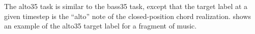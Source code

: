 
The \gls{alto35} task is similar to the \gls{bass35} task,
except that the target label at a given timestep is the
``alto'' note of the \gls{closed-position} chord
realization.  shows an example
of the \gls{alto35} target label for a fragment of music.



